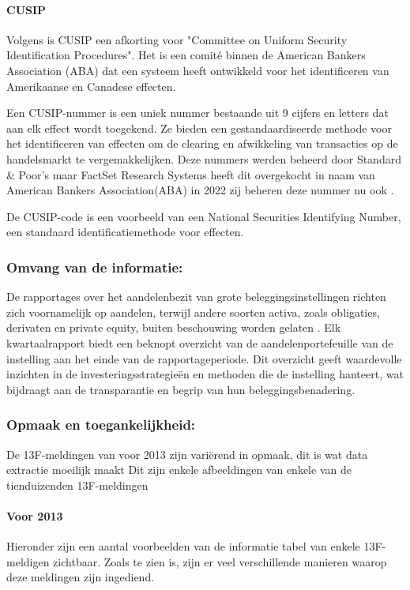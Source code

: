 \paragraph{CUSIP}
Volgens \autocite{Hayes_2024} is CUSIP een afkorting voor "Committee on Uniform Security Identification Procedures". Het is een comité binnen de American Bankers Association (ABA) dat een systeem heeft ontwikkeld voor het identificeren van Amerikaanse en Canadese effecten.

Een CUSIP-nummer is een uniek nummer bestaande uit 9 cijfers en letters dat aan elk effect wordt toegekend. Ze bieden een gestandaardiseerde methode voor het identificeren van effecten om de clearing en afwikkeling van transacties op de handelsmarkt te vergemakkelijken. Deze nummers werden beheerd door Standard \& Poor's maar FactSet Research Systems heeft dit overgekocht in naam van American Bankers Association(ABA) in 2022 zij beheren deze nummer nu ook \autocite{Hayes_2024}.

De CUSIP-code is een voorbeeld van een National Securities Identifying Number, een standaard identificatiemethode voor effecten.

\subsubsection{Omvang van de informatie:}

De rapportages over het aandelenbezit van grote beleggingsinstellingen richten zich voornamelijk op aandelen, terwijl andere soorten activa, zoals obligaties, derivaten en private equity, buiten beschouwing worden gelaten \autocite{SECform13F2024}. Elk kwartaalrapport biedt een beknopt overzicht van de aandelenportefeuille van de instelling aan het einde van de rapportageperiode. Dit overzicht geeft waardevolle inzichten in de investeringsstrategieën en methoden die de instelling hanteert, wat bijdraagt aan de transparantie en begrip van hun beleggingsbenadering.


\subsubsection{Opmaak en toegankelijkheid:}
De 13F-meldingen van voor 2013 zijn variërend in opmaak, dit is wat data extractie moeilijk maakt
Dit zijn enkele afbeeldingen van enkele van de tienduizenden 13F-meldingen

\paragraph{Voor 2013}
Hieronder zijn een aantal voorbeelden van de informatie tabel van enkele 13F-meldigen zichtbaar. Zoals te zien is, zijn er veel verschillende manieren waarop deze meldingen zijn ingediend.

